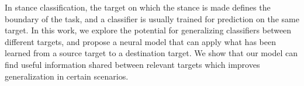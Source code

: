 In stance classification, the target on which the stance is made defines the boundary of the task, and a classifier is usually trained for prediction on the same target. In this work, we explore the potential for generalizing classifiers between different targets, and propose a neural model that can apply what has been learned from a source target to a destination target. We show that our model can find useful information shared between relevant targets which improves generalization in certain scenarios.
